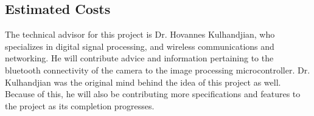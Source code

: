 \documentclass{IEEEtran}					%
\begin{document}
	\subsection{Estimated Costs}
	\begin{table} [h!]	
		\centering
		\caption{Estimated costs of components for project}
		\label{table:1}
					
	\end{table}		
	The technical advisor for this project is Dr. Hovannes Kulhandjian, who specializes in digital signal processing, and wireless communications and networking.	He will contribute advice and information pertaining to the bluetooth connectivity of the camera to the image processing microcontroller. Dr. Kulhandjian was the original mind behind the idea of this project as well. Because of this, he will also be contributing more specifications and features to the project as its completion progresses. 			
	
		
\end{document}
